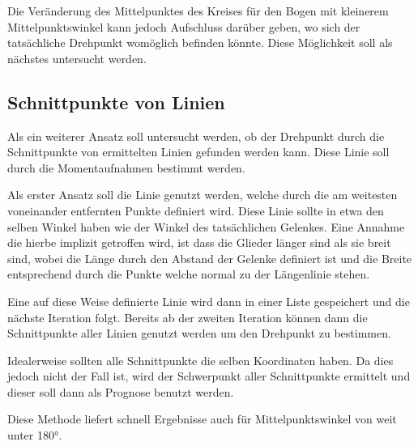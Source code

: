 Die Veränderung des Mittelpunktes des Kreises für den Bogen mit kleinerem Mittelpunktswinkel kann jedoch Aufschluss darüber geben, wo sich der tatsächliche Drehpunkt womöglich befinden könnte.
Diese Möglichkeit soll als nächstes untersucht werden.


\subsection{Schnittpunkte von Linien}

Als ein weiterer Ansatz soll untersucht werden, ob der Drehpunkt durch die Schnittpunkte von ermittelten Linien gefunden werden kann.
Diese Linie soll durch die Momentaufnahmen bestimmt werden.

Als erster Ansatz soll die Linie genutzt werden, welche durch die am weitesten voneinander entfernten Punkte definiert wird.
Diese Linie sollte in etwa den selben Winkel haben wie der Winkel des tatsächlichen Gelenkes.
Eine Annahme die hierbe implizit getroffen wird, ist dass die Glieder länger sind als sie breit sind, wobei die Länge durch den Abstand der Gelenke definiert ist und die Breite entsprechend durch die Punkte welche normal zu der Längenlinie stehen.

Eine auf diese Weise definierte Linie wird dann in einer Liste gespeichert und die nächste Iteration folgt.
Bereits ab der zweiten Iteration können dann die Schnittpunkte aller Linien genutzt werden um den Drehpunkt zu bestimmen.


Idealerweise sollten alle Schnittpunkte die selben Koordinaten haben.
Da dies jedoch nicht der Fall ist, wird der Schwerpunkt aller Schnittpunkte ermittelt und dieser soll dann als Prognose benutzt werden.

Diese Methode liefert schnell Ergebnisse auch für Mittelpunktswinkel von weit unter 180°.

